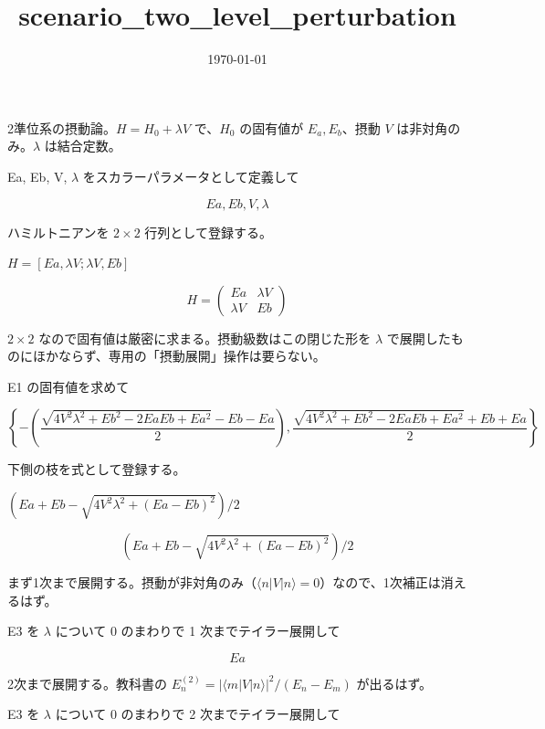 \documentclass[dvipdfmx,a4paper,11pt]{jsarticle}
\title{scenario\_two\_level\_perturbation}
\date{\today}
\begin{document}
\maketitle

2準位系の摂動論。$H=H_0+\lambda V$ で、$H_0$ の固有値が $E_a, E_b$、摂動 $V$ は非対角のみ。$\lambda$ は結合定数。

Ea, Eb, V, $\lambda$ をスカラーパラメータとして定義して

\[
  Ea, Eb, V, \lambda
\]

ハミルトニアンを $2\times2$ 行列として登録する。

$H = [Ea, \lambda V; \lambda V, Eb]$

\begin{equation}
  H = \begin{pmatrix} Ea & \lambda V \\ \lambda V & Eb \end{pmatrix}
  \label{eq:E1}
\end{equation}

$2\times2$ なので固有値は厳密に求まる。摂動級数はこの閉じた形を $\lambda$ で展開したものにほかならず、専用の「摂動展開」操作は要らない。

E1 の固有値を求めて

\begin{equation}
  \left\{ -\left(\frac{\sqrt{4 V^2 \lambda^2+Eb^2-2 Ea Eb+Ea^2}-Eb-Ea}{2}\right) , \frac{\sqrt{4 V^2 \lambda^2+Eb^2-2 Ea Eb+Ea^2}+Eb+Ea}{2} \right\}
  \label{eq:E2}
\end{equation}

下側の枝を式として登録する。

$(Ea + Eb - \sqrt{4 V^2 \lambda^2 + (Ea-Eb)^2})/2$

\begin{equation}
  (Ea + Eb - \sqrt{4 V^2 \lambda^2 + (Ea-Eb)^2})/2
  \label{eq:E3}
\end{equation}

まず1次まで展開する。摂動が非対角のみ（$\langle n|V|n\rangle=0$）なので、1次補正は消えるはず。

E3 を $\lambda$ について 0 のまわりで 1 次までテイラー展開して

\begin{equation}
  Ea
  \label{eq:E4}
\end{equation}

2次まで展開する。教科書の $E^{(2)}_n=|\langle m|V|n\rangle|^2/(E_n-E_m)$ が出るはず。

E3 を $\lambda$ について 0 のまわりで 2 次までテイラー展開して
\end{document}

